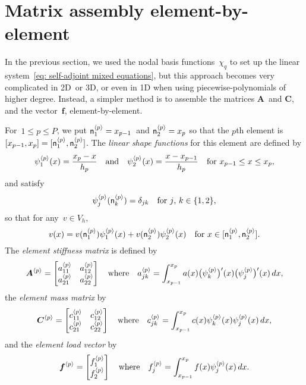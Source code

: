 \section{Matrix assembly element-by-element}\label{sec: matrix assembly 1d}

In the previous section, we used the nodal basis functions~$\chi_q$ to set up 
the linear system~\eqref{eq: self-adjoint mixed equations}, but this approach 
becomes very complicated in 2D~or 3D, or even in 1D when using 
piecewise-polynomials of higher degree.  Instead, a simpler method is to 
assemble the matrices $\boldsymbol{A}$~and $\boldsymbol{C}$, and the 
vector~$\boldsymbol{f}$, element-by-element.  

For~$1\le p\le P$, we put $\mathsf{n}^{\langle p\rangle}_1=x_{p-1}$~and
$\mathsf{n}^{\langle p\rangle}_2=x_p$ so that the $p$th 
element is $[x_{p-1},x_p]=[\mathsf{n}^{\langle p\rangle}_1,\mathsf{n}^{\langle p\rangle}_2]$.  The
\emph{linear shape functions} for this element are defined by
\[
\psi^{\langle p\rangle}_1(x)=\frac{x_p-x}{h_p}
\quad\text{and}\quad
\psi^{\langle p\rangle}_2(x)=\frac{x-x_{p-1}}{h_p}
\quad\text{for $x_{p-1}\le x\le x_p$,}
\]
and satisfy
\[
\psi^{\langle p\rangle}_j(\mathsf{n}^{\langle p\rangle}_k)=\delta_{jk}
    \quad\text{for $j$, $k\in\{1,2\}$,}
\]
so that for any~$v\in V_h$,
\[
v(x)=v(\mathsf{n}^{\langle p\rangle}_1)\psi^{\langle p\rangle}_1(x)
    +v(\mathsf{n}^{\langle p\rangle}_2)\psi^{\langle p\rangle}_2(x)
    \quad\text{for $x\in[\mathsf{n}^{\langle p\rangle}_1,\mathsf{n}^{\langle p\rangle}_2]$.}
\]
The \emph{element stiffness matrix} is defined by
\[
\boldsymbol{A}^{\langle p\rangle}=\begin{bmatrix}
a^{\langle p\rangle}_{11}&a^{\langle p\rangle}_{12}\\
a^{\langle p\rangle}_{21}&a^{\langle p\rangle}_{22}\end{bmatrix}
\quad\text{where}\quad
a^{\langle p\rangle}_{jk}=\int_{x_{p-1}}^{x_p}a(x)\bigl(\psi_k^{\langle p\rangle}\bigr)'(x)
    \bigl(\psi_j^{\langle p\rangle}\bigr)'(x)\,dx,
\]
the \emph{element mass matrix} by
\[
\boldsymbol{C}^{\langle p\rangle}=\begin{bmatrix}
c^{\langle p\rangle}_{11}&c^{\langle p\rangle}_{12}\\
c^{\langle p\rangle}_{21}&c^{\langle p\rangle}_{22}\end{bmatrix}
\quad\text{where}\quad
c^{\langle p\rangle}_{jk}=\int_{x_{p-1}}^{x_p}c(x)\psi_k^{\langle p\rangle}(x) 
    \psi_j^{\langle p\rangle}(x)\,dx,
\]
and the \emph{element load vector} by
\[
\boldsymbol{f}^{\langle p\rangle}=\begin{bmatrix}f^{\langle p\rangle}_1\\ f^{\langle p\rangle}_2\end{bmatrix}
\quad\text{where}\quad
f^{\langle p\rangle}_j=\int_{x_{p-1}}^{x_p}f(x)\psi_j^{\langle p\rangle}(x)\,dx.
\]

